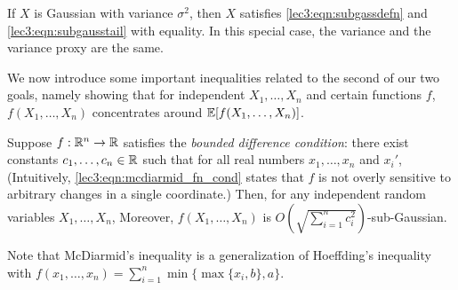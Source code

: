 \begin{example}
If $X$ is Gaussian with variance $\sigma^2$, then $X$ satisfies \eqref{lec3:eqn:subgassdefn} and \eqref{lec3:eqn:subgausstail} with equality. In this special case, the variance and the variance proxy are the same.
\end{example}

We now introduce some important inequalities related to the second of our two goals, namely showing that for independent $X_1, \dotsc, X_n$ and certain functions $f$, $f(X_1, \dotsc, X_n)$ concentrates around $\operatorname*{\mathbb{E}}[f(X_1, \dotsc, X_n)]$.

\begin{theorem}
    Suppose $f : \mathbb R^n \to \mathbb R$ satisfies the \emph{bounded difference condition}: there exist constants $c_1, \ldots, c_n \in \mathbb R$ such that for all real numbers $x_1, \ldots, x_n$ and $x_i'$,
    (Intuitively, \eqref{lec3:eqn:mcdiarmid_fn_cond} states that $f$ is not overly sensitive to arbitrary changes in a single coordinate.) Then, for any independent random variables $X_1, \ldots, X_n$,
    Moreover, $f(X_1, \ldots, X_n)$ is $O\left(\sqrt{\sum_{i = 1}^n c_i^2}\right)$-sub-Gaussian.
\end{theorem}

\begin{remark}
    Note that McDiarmid's inequality is a generalization of Hoeffding's inequality with $f(x_1, \dotsc, x_n) = \sum_{i = 1}^n \min\{\max\{x_i, b\}, a\}$. 
\end{remark}


